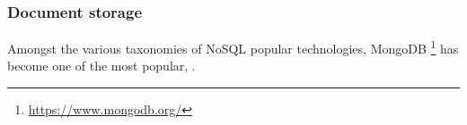 \cite{augustine2002discovering}

\subsubsection*{Document storage}\label{subsec:document-storage}

Amongst the various taxonomies of NoSQL popular technologies,
MongoDB \footnote{\url{https://www.mongodb.org/}} has become one of
the most popular, \cite{tudorica2011comparison, mongo2014leading,
  hecht2011nosql, mongo2013top5}.






\cite{chodorow2013mongodb}
